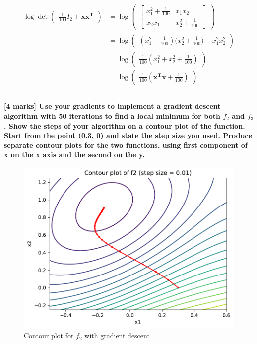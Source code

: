 \documentclass[12pt,twoside]{article}
\begin{document}
\begin{align}
    \operatorname{log} \operatorname{det} \begin{pmatrix} \frac{1}{100}I_2 + \mathbf{xx^T} \end{pmatrix} 
    & = \operatorname{log} \begin{pmatrix} \begin{bmatrix} x_1^2 + \frac{1}{100} & x_1x_2 \\
    x_2x_1 & x_2^2 + \frac{1}{100} \end{bmatrix} \end{pmatrix}  \\
    & = \operatorname{log} \begin{pmatrix} {(x_1^2 + \frac{1}{100})(x_2^2 + \frac{1}{100}}) - x_1^2x_2^2 \end{pmatrix} \\
    & = \operatorname{log} \begin{pmatrix} \frac{1}{100} ( {x_1^2 + x_2^2 + \frac{1}{100}}) \end{pmatrix} \\
    & = \operatorname{log} \begin{pmatrix} \frac{1}{100} ( {\mathbf{x^Tx} + \frac{1}{100}}) \end{pmatrix}
\end{align}
\pagebreak

\subsection[]{}
\textbf{[4 marks] Use your gradients to implement a gradient descent algorithm with 50 iterations to find a local minimum for both $f_2$ and $f_3$. Show the steps of your algorithm on a contour plot of the function. Start from the point (0.3, 0) and state the step size you used. Produce separate contour plots for the two functions, using first component of x on the x axis and the second on the y.}

\begin{figure}[h]
\centering %
\includegraphics[width = 0.65\hsize]{./figures/contour_f2.pdf} %
\caption{Contour plot for $f_2$ with gradient descent}%
\label{fig:f2}
\end{figure}
\end{document}
